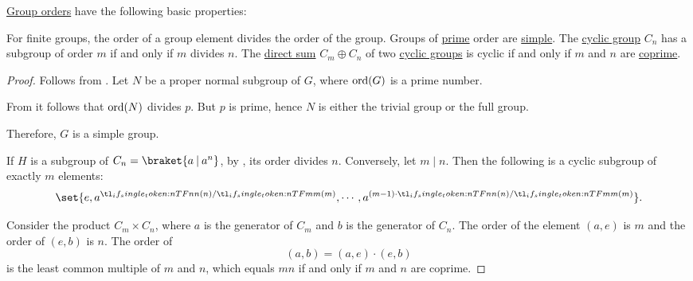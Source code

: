 \begin{proposition}\label{thm:def:group_order}
  \hyperref[def:group_order]{Group orders} have the following basic properties:
  \begin{thmenum}
     For finite groups, the order of a group element divides the order of the group.
     Groups of \hyperref[def:prime_number]{prime} order are \hyperref[def:group/simple]{simple}.
     The \hyperref[def:cyclic_group]{cyclic group} \( C_n \) has a subgroup of order \( m \) if and only if \( m \) divides \( n \).
     The \hyperref[def:monoid_direct_product]{direct sum} \( C_m \oplus C_n \) of two \hyperref[def:cyclic_group]{cyclic groups} is cyclic if and only if \( m \) and \( n \) are \hyperref[def:coprime_elements]{coprime}.
  \end{thmenum}
\end{proposition}
\begin{proof}
   Follows from .
   Let \( N \) be a proper normal subgroup of \( G \), where \( \operatorname{ord}(G) \) is a prime number.

  From  it follows that \( \operatorname{ord}(N) \) divides \( p \). But \( p \) is prime, hence \( N \) is either the trivial group or the full group.

  Therefore, \( G \) is a simple group.

   If \( H \) is a subgroup of \( C_n = \braket{ a \given a^n } \), by , its order divides \( n \). Conversely, let \( m \mid n \). Then the following is a cyclic subgroup of exactly \( m \) elements:
  \begin{equation*}
    \set{ e, a^{\ifrac n m}, \cdots, a^{(m - 1) \cdot \ifrac n m} }.
  \end{equation*}

   Consider the product \( C_m \times C_n \), where \( a \) is the generator of \( C_m \) and \( b \) is the generator of \( C_n \). The order of the element \( (a, e) \) is \( m \) and the order of \( (e, b) \) is \( n \). The order of
  \begin{equation*}
    (a, b) = (a, e) \cdot (e, b)
  \end{equation*}
  is the least common multiple of \( m \) and \( n \), which equals \( mn \) if and only if \( m \) and \( n \) are coprime.
\end{proof}

